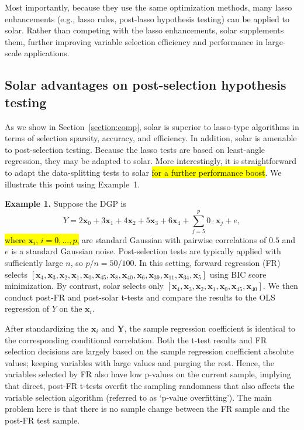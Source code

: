 \documentclass[11pt,review,authoryear]{elsarticle}
\begin{document}
Most importantly, because they use the same optimization methods, many lasso enhancements (e.g., lasso rules, post-lasso hypothesis testing) can be applied to solar. Rather than competing with the lasso enhancements, solar supplements them, further improving variable selection efficiency and performance in large-scale applications.

\subsection{Solar advantages on post-selection hypothesis testing}

As we show in Section~\ref{section:comp}, solar is superior to lasso-type algorithms in terms of selection sparsity, accuracy, and efficiency. In addition, solar is amenable to post-selection testing. Because the lasso tests \citep{lockhartall14, taylor2014exact} are based on least-angle regression, they may be adapted to solar. More interestingly, it is straightforward to adapt the data-splitting tests \citep{wasserman2009high,meinshausen2009p} to solar \hl{for a further performance boost}. We illustrate this point using Example~1.

\smallskip
\noindent
\textbf{Example 1.} Suppose the DGP is
%
\begin{equation}
  Y = 2 \mathbf{x}_0 + 3 \mathbf{x}_1 + 4 \mathbf{x}_2 + 5 \mathbf{x}_3 + 6 \mathbf{x}_4 + \sum_{j=5}^{p} 0 \cdot \mathbf{x}_j + e,
\end{equation}
%
\hl{where $\mathbf{x}_i$, $i=0,\dots,p$,} are standard Gaussian with pairwise correlations of $0.5$ and $e$ is a standard Gaussian noise. Post-selection tests are typically applied with sufficiently large $n$, so $p/n=50/100$. In this setting, forward regression (FR) selects $\left[\mathbf{x}_4, \mathbf{x}_3, \mathbf{x}_2, \mathbf{x}_1, \mathbf{x}_0, \mathbf{x}_{45}, \mathbf{x}_{8}, \mathbf{x}_{40}, \mathbf{x}_{6}, \mathbf{x}_{39}, \mathbf{x}_{11}, \mathbf{x}_{34}, \mathbf{x}_{5} \right]$ using BIC score minimization. By contrast, solar selects only $\left[\mathbf{x}_4, \mathbf{x}_3, \mathbf{x}_2, \mathbf{x}_1, \mathbf{x}_0, \mathbf{x}_{45}, \mathbf{x}_{40} \right]$. We then conduct post-FR and post-solar t-tests and compare the results to the OLS regression of $Y$ on the $\mathbf{x}_i$.

After standardizing the $\mathbf{x}_i$ and $\mathbf{Y}$, the sample regression coefficient is identical to the corresponding conditional correlation. Both the t-test results and FR selection decisions are largely based on the sample regression coefficient absolute values; keeping variables with large values and purging the rest. Hence, the variables selected by FR also have low p-values on the current sample, implying that direct, post-FR t-tests overfit the sampling randomness that also affects the variable selection algorithm (referred to as `p-value overfitting'). The main problem here is that there is no sample change between the FR sample and the post-FR test sample.
\end{document}
